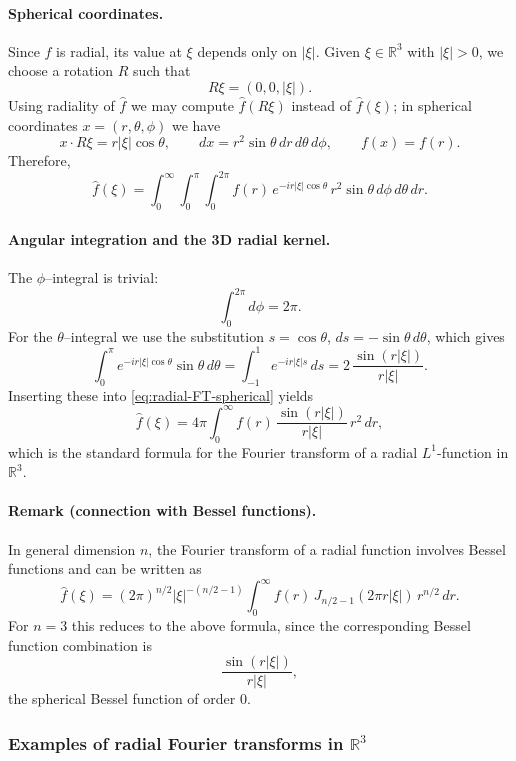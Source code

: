 \documentclass[12pt,a4paper]{article}
\theoremstyle{plain}
\theoremstyle{definition}
\theoremstyle{remark}
\theoremstyle{remark}
\begin{document}
\paragraph{Spherical coordinates.}
Since $\widehat{f}$ is radial, its value at $\xi$ depends only on $|\xi|$.
Given $\xi\in\mathbb{R}^{3}$ with $|\xi|>0$, we choose a rotation $R$ such that
\[
R\xi = (0,0,|\xi|).
\]
Using radiality of $\widehat{f}$ we may compute $\widehat{f}(R\xi)$ instead of
$\widehat{f}(\xi)$; in spherical coordinates $x=(r,\theta,\phi)$ we have
\[
x\cdot R\xi = r|\xi|\cos\theta,
\qquad
dx = r^{2}\sin\theta\,dr\,d\theta\,d\phi,
\qquad
f(x)=f(r).
\]
Therefore,
\begin{equation}\label{eq:radial-FT-spherical}
	\widehat{f}(\xi)
	= \int_{0}^{\infty}\int_{0}^{\pi}\int_{0}^{2\pi}
	f(r)\,e^{-i r|\xi|\cos\theta}\,r^{2}\sin\theta\,
	d\phi\,d\theta\,dr.
\end{equation}

\paragraph{Angular integration and the 3D radial kernel.}
The $\phi$--integral is trivial:
\[
\int_{0}^{2\pi} d\phi = 2\pi.
\]
For the $\theta$--integral we use the substitution $s=\cos\theta$,
$ds=-\sin\theta\,d\theta$, which gives
\[
\int_{0}^{\pi} e^{-i r|\xi|\cos\theta}\sin\theta\,d\theta
= \int_{-1}^{1} e^{-i r|\xi| s}\,ds
= 2\,\frac{\sin(r|\xi|)}{r|\xi|}.
\]
Inserting these into \eqref{eq:radial-FT-spherical} yields
\[
\widehat{f}(\xi)
= 4\pi \int_{0}^{\infty}
f(r)\,\frac{\sin(r|\xi|)}{r|\xi|}\,r^{2}\,dr,
\]
which is the standard formula for the Fourier transform of a radial
$L^{1}$-function in $\mathbb{R}^{3}$.

\paragraph{Remark (connection with Bessel functions).}
In general dimension $n$, the Fourier transform of a radial function involves
Bessel functions and can be written as
\[
\widehat{f}(\xi)
= (2\pi)^{n/2}|\xi|^{-(n/2-1)}
\int_{0}^{\infty} f(r)\,
J_{n/2-1}(2\pi r|\xi|)\,r^{n/2}\,dr.
\]
For $n=3$ this reduces to the above formula, since the corresponding Bessel
function combination is
\[
\frac{\sin(r|\xi|)}{r|\xi|},
\]
the spherical Bessel function of order $0$.

\subsubsection*{Examples of radial Fourier transforms in $\mathbb{R}^3$}
\end{document}
